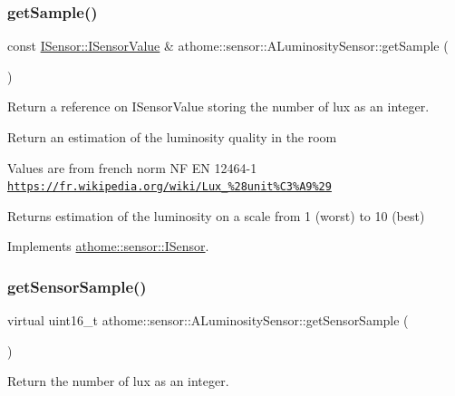 \subsubsection{\texorpdfstring{get\+Sample()}{getSample()}}
{\footnotesize\ttfamily const \mbox{\hyperlink{structathome_1_1sensor_1_1_i_sensor_1_1_i_sensor_value}{I\+Sensor\+::\+I\+Sensor\+Value}} \& athome\+::sensor\+::\+A\+Luminosity\+Sensor\+::get\+Sample (\begin{DoxyParamCaption}{ }\end{DoxyParamCaption})\hspace{0.3cm}{\ttfamily [virtual]}}

Return a reference on I\+Sensor\+Value storing the number of lux as an integer.

Return an estimation of the luminosity quality in the room

Values are from french norm NF EN 12464-\/1 \href{https://fr.wikipedia.org/wiki/Lux_%28unit%C3%A9%29}{\tt https\+://fr.\+wikipedia.\+org/wiki/\+Lux\+\_\+\%28unit\%\+C3\%\+A9\%29} \begin{DoxyReturn}{Returns}
estimation of the luminosity on a scale from 1 (worst) to 10 (best) 
\end{DoxyReturn}


Implements \mbox{\hyperlink{classathome_1_1sensor_1_1_i_sensor_ae109cd3741ea9c88dc7e4f2eaf1485d5}{athome\+::sensor\+::\+I\+Sensor}}.

\mbox{\label{classathome_1_1sensor_1_1_a_luminosity_sensor_ae756f7d7647c2cf695305c8f11aec8d3}} 
\subsubsection{\texorpdfstring{get\+Sensor\+Sample()}{getSensorSample()}}
{\footnotesize\ttfamily virtual uint16\+\_\+t athome\+::sensor\+::\+A\+Luminosity\+Sensor\+::get\+Sensor\+Sample (\begin{DoxyParamCaption}{ }\end{DoxyParamCaption})\hspace{0.3cm}{\ttfamily [pure virtual]}}

Return the number of lux as an integer. 

